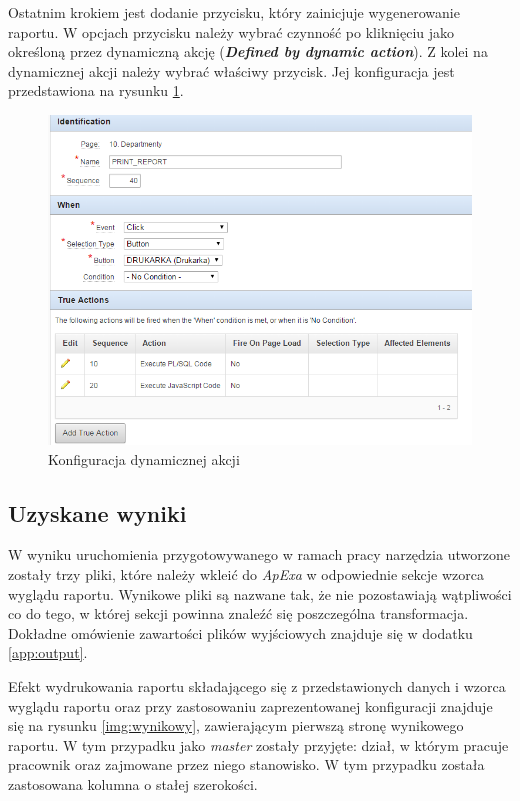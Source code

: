 \documentclass[11pt,a4paper]{article}
\begin{document}
Ostatnim krokiem jest dodanie przycisku, który zainicjuje wygenerowanie raportu. W opcjach przycisku należy wybrać czynność po kliknięciu jako określoną przez dynamiczną akcję (\emph{\textbf{Defined by dynamic action}}). Z kolei na dynamicznej akcji należy wybrać właściwy przycisk. Jej konfiguracja jest przedstawiona na rysunku \ref{img:action}.

\begin{figure}[h]
\centering
\includegraphics[scale=0.8]{action}
\caption{Konfiguracja dynamicznej akcji}
\label{img:action}
\end{figure}


\subsection{Uzyskane wyniki} \label{test:result}
W wyniku uruchomienia przygotowywanego w ramach pracy narzędzia utworzone zostały trzy pliki, które należy wkleić do \emph{ApExa} w odpowiednie sekcje wzorca wyglądu raportu. Wynikowe pliki są nazwane tak, że nie pozostawiają wątpliwości co do tego, w której sekcji powinna znaleźć się poszczególna transformacja. Dokładne omówienie zawartości plików wyjściowych znajduje się w dodatku \ref{app:output}.

Efekt wydrukowania raportu składającego się z przedstawionych danych i wzorca wyglądu raportu oraz przy zastosowaniu zaprezentowanej konfiguracji znajduje się na rysunku \ref{img:wynikowy}, zawierającym pierwszą stronę wynikowego raportu. W tym przypadku jako \emph{master} zostały przyjęte: dział, w którym pracuje pracownik oraz zajmowane przez niego stanowisko. W tym przypadku została zastosowana kolumna o stałej szerokości. 
\end{document}
